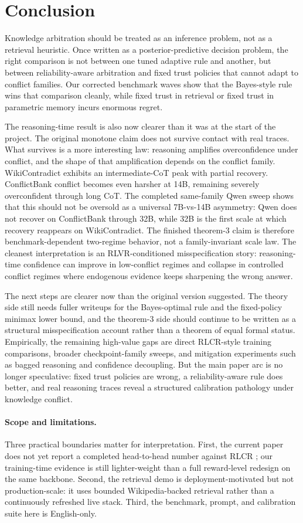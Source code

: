 \section{Conclusion}

Knowledge arbitration should be treated as an inference problem, not as a
retrieval heuristic. Once written as a posterior-predictive decision problem,
the right comparison is not between one tuned adaptive rule and another, but
between reliability-aware arbitration and fixed trust policies that cannot
adapt to conflict families. Our corrected benchmark waves show that the
Bayes-style rule wins that comparison cleanly, while fixed trust in retrieval
or fixed trust in parametric memory incurs enormous regret.

The reasoning-time result is also now clearer than it was at the start of the
project. The original monotone claim does not survive contact with real traces.
What survives is a more interesting law: reasoning amplifies overconfidence
under conflict, and the shape of that amplification depends on the conflict
family. WikiContradict exhibits an intermediate-CoT peak with partial recovery.
ConflictBank conflict becomes even harsher at 14B, remaining severely
overconfident through long CoT. The completed same-family Qwen sweep shows that
this should not be oversold as a universal 7B-vs-14B asymmetry: Qwen does not
recover on ConflictBank through 32B, while 32B is the first scale at which
recovery reappears on WikiContradict. The finished theorem-3 claim is therefore
benchmark-dependent two-regime behavior, not a family-invariant scale law. The
cleanest interpretation is an RLVR-conditioned misspecification story:
reasoning-time confidence can improve in low-conflict regimes and collapse in
controlled conflict regimes where endogenous evidence keeps sharpening the wrong
answer.

The next steps are clearer now than the original version suggested. The theory
side still needs fuller writeups for the Bayes-optimal rule and the fixed-policy
minimax lower bound, and the theorem-3 side should continue to be written as a
structural misspecification account rather than a theorem of equal formal
status. Empirically, the remaining high-value gaps are direct RLCR-style
training comparisons, broader checkpoint-family sweeps, and mitigation
experiments such as bagged reasoning and confidence decoupling. But the main
paper arc is no longer speculative: fixed trust policies are wrong, a
reliability-aware rule does better, and real reasoning traces reveal a
structured calibration pathology under knowledge conflict.

\paragraph{Scope and limitations.}
Three practical boundaries matter for interpretation. First, the current paper
does not yet report a completed head-to-head number against RLCR
\citep{damani2025rlcr}; our training-time evidence is still lighter-weight than
a full reward-level redesign on the same backbone. Second, the retrieval demo
is deployment-motivated but not production-scale: it uses bounded
Wikipedia-backed retrieval rather than a continuously refreshed live stack.
Third, the benchmark, prompt, and calibration suite here is English-only.
